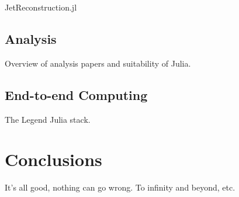 \documentclass{webofc}
\begin{document}
JetReconstruction.jl

\subsection{Analysis}

Overview of analysis papers and suitability of Julia.

\subsection{End-to-end Computing}

The Legend Julia stack.

\section{Conclusions}

It's all good, nothing can go wrong. To infinity and beyond, etc.

\sloppy
\raggedright

\end{document}

